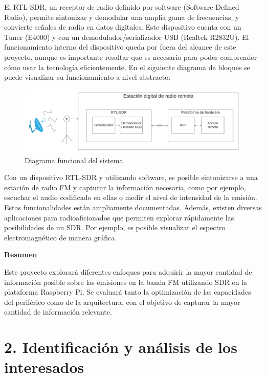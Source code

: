 \documentclass[
11pt, %
codirector, %
]{charter}
\begin{document}
El RTL-SDR, un receptor de radio definido por software (Software Defined Radio), permite sintonizar y demodular una amplia gama de frecuencias, y convierte señales de radio en datos digitales. Este dispositivo cuenta con un Tuner (E4000) y con un demodulador/serializador USB (Realtek R2832U). El funcionamiento interno del dispositivo queda por fuera del alcance de este proyecto, aunque es importante resaltar que es necesario para poder comprender cómo usar la tecnología eficientemente. En el siguiente diagrama de bloques se puede visualizar su funcionamiento a nivel abstracto:

\begin{figure}[h]
\centering 
\includegraphics[width=.85\textwidth]{./Figuras/blocksUBA.png} 
\caption{Diagrama funcional del sistema.}
\label{fig:diagBloques}
\end{figure}

Con un dispositivo RTL-SDR y utilizando software, es posible sintonizarse a una estación de radio FM y capturar la información necesaria, como por ejemplo, escuchar el audio codificado en ellas o medir el nivel de intensidad de la emisión. Estas funcionalidades están ampliamente documentadas. Además, existen diversas aplicaciones para radioaficionados que permiten explorar rápidamente las posibilidades de un SDR. Por ejemplo, es posible visualizar el espectro electromagnético de manera gráfica.

\textbf{Resumen}

Este proyecto explorará diferentes enfoques para adquirir la mayor cantidad de información posible sobre las emisiones en la banda FM utilizando SDR en la plataforma Raspberry Pi. Se evaluará tanto la optimización de las capacidades del periférico como de la arquitectura, con el objetivo de capturar la mayor cantidad de información relevante.


\section{2. Identificación y análisis de los interesados}
\label{sec:interesados}
\end{document}
